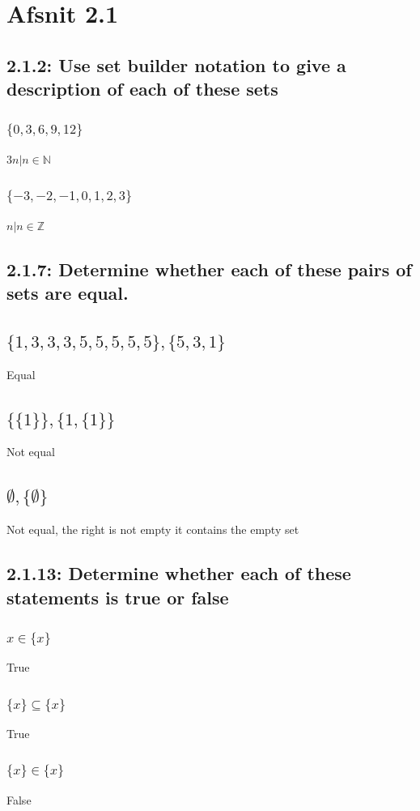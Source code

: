 \documentclass[12pt, a4paper]{report}
\begin{document}
		\section{Afsnit 2.1}
			\setcounter{subsection}{1}
			\subsection{2.1.2: Use set builder notation to give a description of each of these sets}
			\subsubsection{$\{0,3,6,9,12\}$}
					$3n|n\in\mathbb{N}$
				\subsubsection{$\{-3,-2,-1,0,1,2,3\}$}
					$n|n\in\mathbb{Z}$
			\setcounter{subsection}{6}
			\subsection{2.1.7: Determine whether each of these pairs of sets are equal.}
				\subsection{$\{1,3,3,3,5,5,5,5,5\},\{5,3,1\}$}
					Equal
				\subsection{$\{\{1\}\},\{1,\{1\}\}$}
					Not equal
				\subsection{$\emptyset, \{\emptyset\}$}
					Not equal, the right is not empty it contains the empty set
				\setcounter{subsection}{12}
				\subsection{2.1.13: Determine whether each of these statements is true or false}
					\subsubsection{$x\in\{x\}$}
						True
					\subsubsection{$\{x\}\subseteq \{x\}$}
						True
					\subsubsection{$\{x\}\in\{x\}$}
						False
\end{document}
